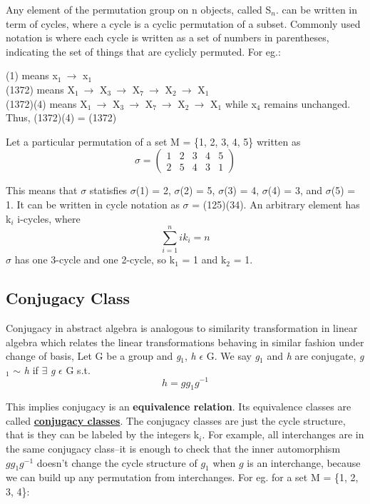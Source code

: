 Any element of the permutation group on n objects, called S$_n$. can be written
in term of cycles, where a cycle is a cyclic permutation of a subset.
Commonly used notation is where each cycle is written as a set of numbers in parentheses, 
indicating the set of things that are cyclicly permuted. For eg.:

(1) means x$_1 \: \rightarrow$ x$_1$ \\
(1372) means X$_1 \: \rightarrow$ X$_3 \: \rightarrow$ X$_7 \: \rightarrow$ X$_2 \: \rightarrow$ X$_1$ \\
(1372)(4) means X$_1 \: \rightarrow$ X$_3 \: \rightarrow$ X$_7 \: \rightarrow$ X$_2 \: \rightarrow$ X$_1$ while x$_4$ remains unchanged.
Thus, (1372)(4) = (1372)

Let a particular permutation of a set M = \{1, 2, 3, 4, 5\} written as
\begin{equation}
   \sigma = \begin{pmatrix}
        1 & 2 & 3 & 4 & 5\\ 
        2 & 5 & 4 & 3 & 1
   \end{pmatrix}
\end{equation}

This means that $\sigma$ statisfies $\sigma$(1) = 2, $\sigma$(2) = 5, $\sigma$(3) = 4, $\sigma$(4) = 3, and $\sigma$(5) = 1.
It can be written in cycle notation as $\sigma$ = (125)(34).
An arbitrary element has k$_i$ i-cycles, where
\begin{equation}
    \sum_{i=1}^{n} ik_i = n
\end{equation}
$\sigma$ has one 3-cycle and one 2-cycle, so k$_1$ = 1 and k$_2$ = 1.

\subsection{Conjugacy Class}
Conjugacy in abstract algebra is analogous to similarity transformation in linear algebra
which relates the linear transformations behaving in similar fashion under change of basis,
Let G be a group and \textit{g$_1$}, \textit{h} $\epsilon$ G. We say \textit{g$_1$} and \textit{h} are conjugate,
\textit{g$_1$} $\sim$ \textit{h} if $\exists$ \textit{g} $\epsilon$ G s.t. 
\begin{equation}
    h = gg_1g^{-1} 
\end{equation}

This implies conjugacy is an \textbf{equivalence relation}. Its equivalence classes are called \href{https://www.youtube.com/watch?v=yOt3ppQGuto}{\textbf{conjugacy classes}}.
The conjugacy classes are just the cycle structure, that is they can be labeled
by the integers k$_i$. For example, all interchanges are in the same conjugacy class--it is enough to check that the inner automorphism $gg_1g^{-1}$ doesn't
change the cycle structure of $g_1$ when $g$ is an interchange, because we can build up any permutation from interchanges.
For eg. for a set M = \{1, 2, 3, 4\}:

